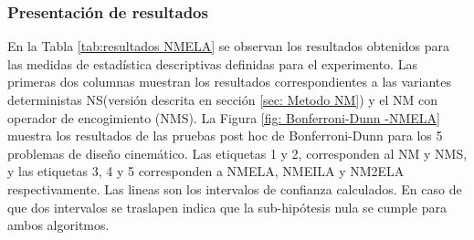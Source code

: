  \subsubsection{Presentación de resultados}
 En la Tabla \ref{tab:resultados NMELA} se observan los resultados obtenidos para las medidas de estadística descriptivas definidas para el experimento. Las primeras dos columnas muestran los resultados correspondientes a las variantes deterministas NS(versión descrita en sección \ref{sec: Metodo NM}) y el NM con operador de encogimiento (NMS).  La Figura \ref{fig: Bonferroni-Dunn -NMELA} muestra los resultados de las pruebas post hoc de Bonferroni-Dunn para los 5 problemas de diseño cinemático. Las etiquetas 1 y 2, corresponden al NM y NMS, y las etiquetas 3, 4 y 5 corresponden a NMELA, NMEILA y NM2ELA respectivamente. Las lineas son los intervalos de confianza calculados. En caso de que dos intervalos se traslapen indica que la sub-hipótesis nula se cumple para ambos algoritmos.
